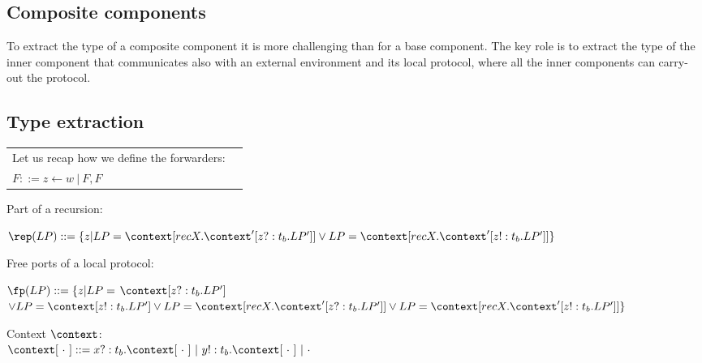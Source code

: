 \begin{center}
  \section{ Composite components}
\end{center}


To extract the type of a composite component it is more challenging than for a base component. The key role is to extract the type of the inner component that communicates also with an external environment and its local protocol, where all the inner components can carry-out the protocol.


\vspace{1cm}

\subsection{Type extraction}
\vspace{0.5cm}



\begin{tabular}{l l}

Let us recap how we define the forwarders: \\
$F::=z\leftarrow w\ |\ F,F$\\

\end{tabular}


\vspace{0.5cm}


Part of a recursion:

\vspace{0.5cm}

$\rep (LP)::=\{z|LP=\context[recX.\context'[z?:t_b.LP']]\lor LP=\context[recX.\context'[z!:t_b.LP']]\}$

\vspace{0.5cm}

Free ports of a local protocol:

\vspace{0.5cm}
$\fp(LP)::= \{z|LP=$ $\context[z?:t_b.LP']$ $\lor LP=\context[z!:t_b.LP'] \lor LP=\context[recX.\context'[z?:t_b.LP']] \lor LP=\context[recX.\context'[z!:t_b.LP']]\}$

\vspace{0.5cm}

Context $\context$:\\

$\context[\  \cdot \ ]::=x?:t_b.\context[\ \cdot \ ]\ |\ y!:t_b.\context[\ \cdot \ ]\  |\ \cdot$ \\

